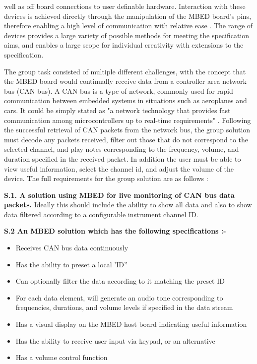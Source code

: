 well as off board connections to user definable hardware. 
Interaction with these devices is achieved directly through the manipulation of 
the MBED board's pins, therefore enabling a high level of communication with 
relative ease \cite{mbed-pins}. 
The range of devices provides a large variety of possible methods for meeting 
the specification aims, and enables a large scope for individual creativity with 
extensions to the specification.
\par\bigskip\noindent
The group task consisted of multiple different challenges, with the concept
that the MBED board would continually receive data from a controller area network
bus (CAN bus). 
A CAN bus is a type of network, commonly used for rapid 
communication between embedded systems in situations such as aeroplanes and cars.
It could be simply stated as "a network technology that provides fast 
communication among microcontrollers up to real-time requirements" 
\cite{voss2005comprehensible}. 
Following the successful retrieval of CAN packets 
from the network bus, the group solution must decode any packets received, 
filter out those that do not correspond to the selected channel, 
and play notes corresponding to the frequency, volume, and duration specified 
in the received packet.
In addition the user must be able to view useful information, select the channel 
id, and adjust the volume of the device. 
The full requirements for the group solution are as follows 
\cite{specification}:
\par\bigskip\noindent
\textbf{S.1. A solution using MBED for live monitoring of CAN bus data packets.}
\hangindent=0.7cm
Ideally this should include the ability to show all data and also 
to show data filtered according to a configurable instrument channel ID.
\par\bigskip\noindent
\textbf{S.2 An MBED solution which has the following specifications :-}
\begin{itemize}
        \item 
            Receives CAN bus data continuously
        \item 
            Has the ability to preset a local 'ID”
        \item 
            Can optionally filter the data according to it matching the preset ID
        \item 
            For each data element, will generate an audio tone corresponding to frequencies,
            durations, and volume levels if specified in the data stream
        \item 
            Has a visual display on the MBED host board indicating useful information
        \item 
            Has the ability to receive user input via keypad, or an alternative
        \item 
            Has a volume control function
\end{itemize}
